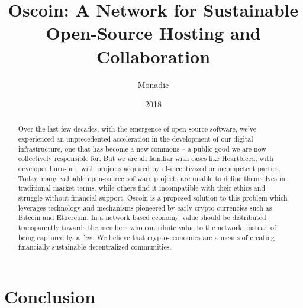 \documentclass[a4paper, 10pt, draft]{amsart}
\title[Oscoin]{Oscoin: A Network for Sustainable Open-Source Hosting and Collaboration}
\author{Monadic}
\date{2018}
\begin{document}
\begin{abstract}
    Over the last few decades, with the emergence of open-source software,
    we've experienced an unprecedented acceleration in the development of our
    digital infrastructure, one that has become a new commons -- a public good
    we are now collectively responsible for. But we are all familiar with cases
    like Heartbleed, with developer burn-out, with projects acquired by
    ill-incentivized or incompetent parties. Today, many valuable open-source
    software projects are unable to define themselves in traditional market
    terms, while others find it incompatible with their ethics and struggle
    without financial support. Oscoin is a proposed solution to this problem
    which leverages technology and mechanisms pioneered by early
    crypto-currencies such as Bitcoin and Ethereum.  In a network based
    economy, value should be distributed transparently towards the members who
    contribute value to the network, instead of being captured by a few.  We
    believe that crypto-economies are a means of creating financially
    sustainable decentralized communities.
\end{abstract}

\maketitle

\pagebreak

\tableofcontents
\pagebreak















\section{Conclusion}

\appendix
\end{document}
